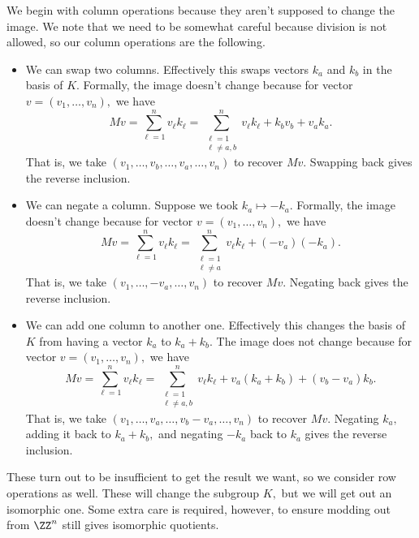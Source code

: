 We begin with column operations because they aren't supposed to change the image. We note that we need to be somewhat careful because division is not allowed, so our column operations are the following.
\begin{itemize}
    \item We can swap two columns. Effectively this swaps vectors $k_a$ and $k_b$ in the basis of $K.$ Formally, the image doesn't change because for vector $v=(v_1,\ldots,v_n),$ we have
    \[Mv=\sum_{\ell=1}^nv_\ell k_\ell=\sum_{\substack{\ell=1\\\ell\ne a,b}}^nv_\ell k_\ell+k_bv_b+v_ak_a.\]
    That is, we take $(v_1,\ldots,v_b,\ldots,v_a,\ldots,v_n)$ to recover $Mv.$ Swapping back gives the reverse inclusion.
    \item We can negate a column. Suppose we took $k_a\mapsto-k_a.$ Formally, the image doesn't change because for vector $v=(v_1,\ldots,v_n),$ we have
    \[Mv=\sum_{\ell=1}^nv_\ell k_\ell=\sum_{\substack{\ell=1\\\ell\ne a}}^nv_\ell k_\ell+(-v_a)(-k_a).\]
    That is, we take $(v_1,\ldots,-v_a,\ldots,v_n)$ to recover $Mv.$ Negating back gives the reverse inclusion.
    \item We can add one column to another one. Effectively this changes the basis of $K$ from having a vector $k_a$ to $k_a+k_b.$ The image does not change because for vector $v=(v_1,\ldots,v_n),$ we have
    \[Mv=\sum_{\ell=1}^nv_\ell k_\ell=\sum_{\substack{\ell=1\\\ell\ne a,b}}^nv_\ell k_\ell+v_a(k_a+k_b)+(v_b-v_a)k_b.\]
    That is, we take $(v_1,\ldots,v_a,\ldots,v_b-v_a,\ldots,v_n)$ to recover $Mv.$ Negating $k_a,$ adding it back to $k_a+k_b,$ and negating $-k_a$ back to $k_a$ gives the reverse inclusion.
\end{itemize}
These turn out to be insufficient to get the result we want, so we consider row operations as well. These will change the subgroup $K,$ but we will get out an isomorphic one. Some extra care is required, however, to ensure modding out from $\ZZ^n$ still gives isomorphic quotients.
